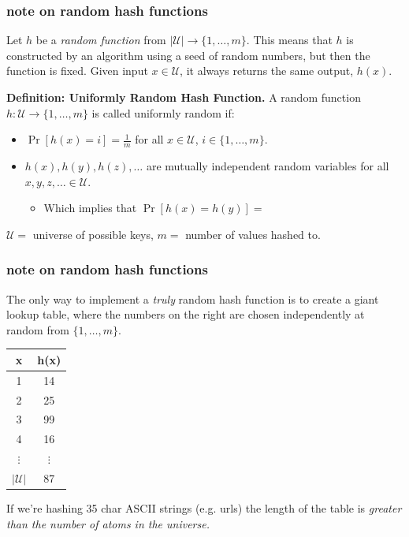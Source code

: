 \documentclass[handout,compress]{beamer}
\begin{document}
	\begin{frame}
	\frametitle{note on random hash functions}
	Let $h$ be a \emph{random function} from $|\mathcal{U}| \rightarrow \{1,\ldots, m\}$. This means that $h$ is constructed by an algorithm using a seed of random numbers, but then the function is fixed. Given input $x\in \mathcal{U}$, it always returns the same output, $h(x)$. 
	
	\textbf{Definition: Uniformly Random Hash Function.} 
	A random function $h: \mathcal{U}\rightarrow \{1, \ldots, m\}$ is called uniformly random if:
	\begin{itemize}
		\item $\Pr[h(x) = i] = \frac{1}{m}$ for all $x\in \mathcal{U}$, $i\in \{1,\ldots, m\}$.  
		\vspace{.5em}
		\item $h(x), h(y), h(z), \ldots$ are mutually independent random variables for all $x,y,z, \ldots \in \mathcal{U}$. 
		\begin{itemize}
			\vspace{.5em}
			\item Which implies that $\Pr[h(x) = h(y)] = $ 
		\end{itemize}
	\end{itemize}
	
	\vspace{2em}
	\begin{block}{\vspace*{-3ex}}
		\small $\mathcal{U} = $ universe of possible keys, $m=$ number of values hashed to.
	\end{block}
\end{frame}

	\begin{frame}[t]
	\frametitle{note on random hash functions}
	\begin{center}
	The only way to implement a \emph{truly} random hash function is to create a giant lookup table, where the numbers on the right are chosen independently at random from $\{1, \ldots, m\}$. 
	
		\begin{tabular}{c | c } 
		x & h(x) \\
		\hline 
		1 & 14\\ 
		2 & 25\\ 
		3 & 99\\ 
		4 & 16\\ 
		$\vdots$ & $\vdots$\\
		$|\mathcal{U}|$ & 87
		\end{tabular}
	\end{center}
If we're hashing 35 char ASCII strings (e.g. urls) the length of the table is \emph{greater than the number of atoms in the universe.}
	\end{frame}
\end{document}
